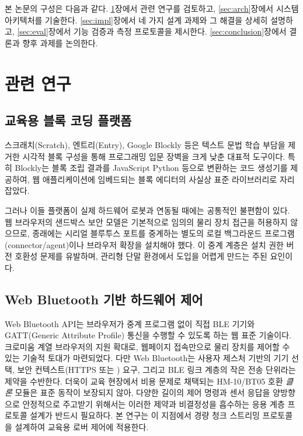 \documentclass[10pt]{article}
\begin{document}
본 논문의 구성은 다음과 같다. \ref{sec:related}장에서 관련 연구를 검토하고,
\ref{sec:arch}장에서 시스템 아키텍처를 기술한다. \ref{sec:impl}장에서 네 가지
설계 과제와 그 해결을 상세히 설명하고, \ref{sec:eval}장에서 기능 검증과 측정
프로토콜을 제시한다. \ref{sec:conclusion}장에서 결론과 향후 과제를 논의한다.

\section{관련 연구}
\label{sec:related}

\subsection{교육용 블록 코딩 플랫폼}
스크래치(Scratch)\cite{scratch}, 엔트리(Entry)\cite{entry}, Google
Blockly\cite{blockly} 등은 텍스트 문법 학습 부담을 제거한 시각적 블록 구성을 통해
프로그래밍 입문 장벽을 크게 낮춘 대표적 도구이다. 특히 Blockly는 블록 조립 결과를
JavaScript\,\textperiodcentered\,Python 등으로 변환하는 코드 생성기를 제공하여,
웹 애플리케이션에 임베드되는 블록 에디터의 사실상 표준 라이브러리로 자리 잡았다.

그러나 이들 플랫폼이 실제 하드웨어 로봇과 연동될 때에는 공통적인 불편함이 있다.
웹 브라우저의 샌드박스 보안 모델은 기본적으로 임의의 물리 장치 접근을 허용하지
않으므로, 종래에는 시리얼\,\textperiodcentered\,블루투스 포트를 중계하는 별도의
로컬 백그라운드 프로그램(connector/agent)이나 브라우저 확장을 설치해야 했다. 이
중계 계층은 설치\,\textperiodcentered\,권한\,\textperiodcentered\,버전
호환성 문제를 유발하며, 관리형 단말 환경에서 도입을 어렵게 만드는 주된 요인이다.

\subsection{Web Bluetooth 기반 하드웨어 제어}
Web Bluetooth API\cite{webbluetooth}는 브라우저가 중계 프로그램 없이 직접 BLE
기기와 GATT(Generic Attribute Profile) 통신을 수행할 수 있도록 하는 웹 표준
기술이다. 크로미움 계열 브라우저의 지원 확대로, 웹페이지 접속만으로 물리 장치를
제어할 수 있는 기술적 토대가 마련되었다. 다만 Web Bluetooth는 사용자 제스처
기반의 기기 선택, 보안 컨텍스트(HTTPS 또는 ) 요구, 그리고 BLE
링크 계층의 작은 전송 단위라는 제약을 수반한다. 더욱이 교육 현장에서 비용 문제로
채택되는 HM-10/BT05 호환 \emph{클론} 모듈은 표준 동작이 보장되지 않아, 다양한
길이의 제어 명령과 센서 응답을 양방향으로 안정적으로 주고받기 위해서는 이러한
제약과 비결정성을 흡수하는 응용 계층 프로토콜 설계가 반드시 필요하다. 본 연구는
이 지점에서 경량 청크 스트리밍 프로토콜을 설계하여 교육용 로버 제어에 적용한다.
\end{document}
